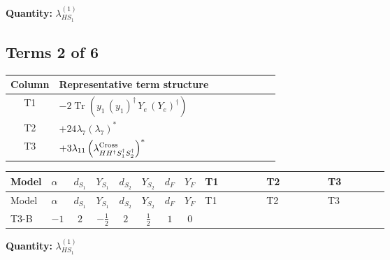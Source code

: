\documentclass[8pt]{article}
\begin{document}
\begin{landscape}
\begin{longtable}{@{}llcccccc >{\raggedright\arraybackslash}p{0.21\linewidth} >{\raggedright\arraybackslash}p{0.21\linewidth} >{\raggedright\arraybackslash}p{0.21\linewidth}@{}}
\midrule
\bottomrule
\end{longtable}
\clearpage
\noindent\textbf{Quantity: }$\lambda_{HS_1}^{(1)}$\par\smallskip
\subsection*{Terms 2 of 6}
\begin{center}
\begin{tabular}{@{}c >{\raggedright\arraybackslash}p{0.82\linewidth}@{}}
\toprule
Column & Representative term structure \\
\midrule
T1 & \(\displaystyle -2 \operatorname{Tr}\!\left({y_1}\,\left({y_1}\right)^{\dagger}\,{Y_e}\,\left({Y_e}\right)^{\dagger}\right)\) \\
\midrule
T2 & \(\displaystyle +24 {\lambda_{7}} \left({\lambda_{7}}\right)^{*}\) \\
\midrule
T3 & \(\displaystyle +3 {\lambda_{11}} \left({\lambda_{H H^\dagger S_1^\dagger S_2^\dagger}^{\rm Cross}}\right)^{*}\) \\
\midrule
\bottomrule
\end{tabular}
\end{center}
\smallskip
\tiny
\begin{longtable}{@{}llcccccc >{\raggedright\arraybackslash}p{0.21\linewidth} >{\raggedright\arraybackslash}p{0.21\linewidth} >{\raggedright\arraybackslash}p{0.21\linewidth}@{}}
\toprule
Model & $\alpha$ & $d_{S_1}$ & $Y_{S_1}$ & $d_{S_2}$ & $Y_{S_2}$ & $d_F$ & $Y_F$ & T1 & T2 & T3 \\
\midrule
\endfirsthead
\toprule
Model & $\alpha$ & $d_{S_1}$ & $Y_{S_1}$ & $d_{S_2}$ & $Y_{S_2}$ & $d_F$ & $Y_F$ & T1 & T2 & T3 \\
\midrule
\endhead
T3-B & $-1$ & $2$ & $-\frac{1}{2}$ & $2$ & $\frac{1}{2}$ & $1$ & $0$ & \scriptsize\adjustbox{max width=\linewidth}{$\begin{gathered} -2 \operatorname{Tr}\!\left({y_1}\,\left({y_1}\right)^{\dagger}\,{Y_e}\,\left({Y_e}\right)^{\dagger}\right)\end{gathered}$} & \scriptsize\adjustbox{max width=\linewidth}{$\begin{gathered} +24 {\lambda_{7}} \left({\lambda_{7}}\right)^{*}\end{gathered}$} & \scriptsize\adjustbox{max width=\linewidth}{$\begin{gathered} +3 {\lambda_{11}} \left({\lambda_{H H^\dagger S_1^\dagger S_2^\dagger}^{\rm Cross}}\right)^{*}\end{gathered}$} \\
\midrule
\bottomrule
\end{longtable}
\clearpage
\noindent\textbf{Quantity: }$\lambda_{HS_1}^{(1)}$\par\smallskip

\end{landscape}
\end{document}
